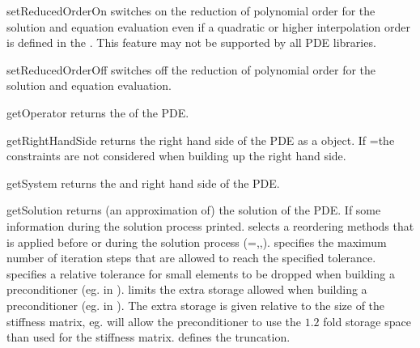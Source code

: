 \begin{methoddesc}[LinearPDE]{setReducedOrderOn}{}
switches on the reduction of polynomial order for the solution and equation evaluation even if 
a quadratic or higher interpolation order is defined in the \Domain. This feature may not 
be supported by all PDE libraries.
\end{methoddesc}

\begin{methoddesc}[LinearPDE]{setReducedOrderOff}{}
switches off the reduction of polynomial order for the solution and 
equation evaluation.
\end{methoddesc}

\begin{methoddesc}[LinearPDE]{getOperator}{}
returns the \Operator of the PDE.
\end{methoddesc}

\begin{methoddesc}[LinearPDE]{getRightHandSide}{}
returns the right hand side of the PDE as a \Data object. If
=\True the constraints are not considered
when building up the right hand side.
\end{methoddesc}

\begin{methoddesc}[LinearPDE]{getSystem}{}
returns the \Operator and right hand side of the PDE.
\end{methoddesc}

\begin{methoddesc}[LinearPDE]{getSolution}{
}
returns (an approximation of) the solution of the PDE. If  some information during the solution process printed.
 selects a reordering methods that is applied before or during the solution process 
(=\NOREORDERING ,\MINIMUMFILLIN ,\NESTEDDESCTION).
 specifies the maximum number of iteration steps that are allowed to reach the specified tolerance. 
 specifies a relative tolerance for small elements to be dropped when building a preconditioner
(eg. in \ILUT).  limits the extra storage allowed when building a preconditioner
(eg. in \ILUT). The extra storage is given relative to the size of the stiffness matrix, eg. 
 will allow the preconditioner to use the $1.2$ fold storage space than used 
for the stiffness matrix.  defines the truncation. 
\end{methoddesc}

